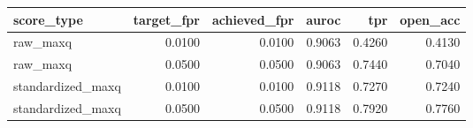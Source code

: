 \begin{tabular}{lrrrrr}
\toprule
score_type & target_fpr & achieved_fpr & auroc & tpr & open_acc \\
\midrule
raw_maxq & 0.0100 & 0.0100 & 0.9063 & 0.4260 & 0.4130 \\
raw_maxq & 0.0500 & 0.0500 & 0.9063 & 0.7440 & 0.7040 \\
standardized_maxq & 0.0100 & 0.0100 & 0.9118 & 0.7270 & 0.7240 \\
standardized_maxq & 0.0500 & 0.0500 & 0.9118 & 0.7920 & 0.7760 \\
\bottomrule
\end{tabular}
